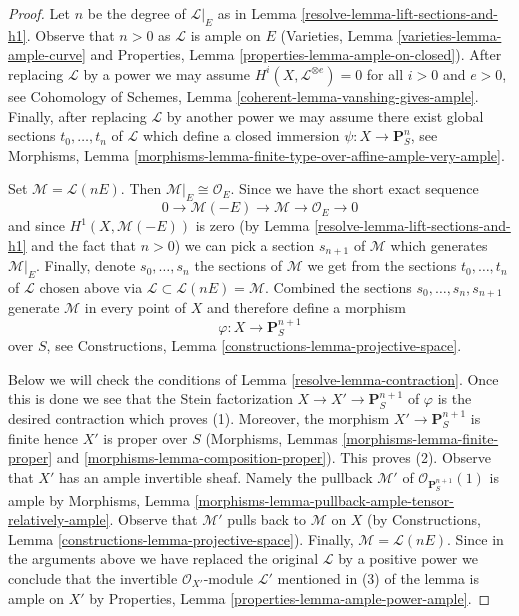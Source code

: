 \begin{proof}

Let $n$ be the degree of $\mathcal{L}|_E$ as in
Lemma \ref{resolve-lemma-lift-sections-and-h1}.
Observe that $n > 0$ as $\mathcal{L}$ is ample on $E$
(Varieties, Lemma \ref{varieties-lemma-ample-curve} and
Properties, Lemma \ref{properties-lemma-ample-on-closed}).
After replacing $\mathcal{L}$ by a power we may assume
$H^i(X, \mathcal{L}^{\otimes e}) = 0$ for all $i > 0$ and $e > 0$, see
Cohomology of Schemes,
Lemma \ref{coherent-lemma-vanshing-gives-ample}.
Finally, after replacing $\mathcal{L}$ by another power we may assume
there exist global sections $t_0, \ldots, t_n$ of $\mathcal{L}$
which define a closed immersion $\psi : X \to \mathbf{P}^n_S$, see
Morphisms, Lemma
\ref{morphisms-lemma-finite-type-over-affine-ample-very-ample}.

\medskip\noindent
Set $\mathcal{M} = \mathcal{L}(nE)$. Then $\mathcal{M}|_E \cong \mathcal{O}_E$.
Since we have the short exact sequence
$$
0 \to \mathcal{M}(-E) \to \mathcal{M} \to \mathcal{O}_E \to 0
$$
and since $H^1(X, \mathcal{M}(-E))$ is zero
(by Lemma \ref{resolve-lemma-lift-sections-and-h1} and the fact that $n > 0$)
we can pick a section $s_{n + 1}$ of $\mathcal{M}$ which generates
$\mathcal{M}|_E$.
Finally, denote $s_0, \ldots, s_n$ the sections of $\mathcal{M}$
we get from the sections $t_0, \ldots, t_n$ of $\mathcal{L}$
chosen above via $\mathcal{L} \subset \mathcal{L}(nE) = \mathcal{M}$.
Combined the sections $s_0, \ldots, s_n, s_{n + 1}$
generate $\mathcal{M}$ in every point of $X$ and therefore define
a morphism
$$
\varphi : X \longrightarrow \mathbf{P}^{n + 1}_S
$$
over $S$, see Constructions, Lemma \ref{constructions-lemma-projective-space}.

\medskip\noindent
Below we will check the conditions of Lemma \ref{resolve-lemma-contraction}.
Once this is done we see that the Stein factorization
$X \to X' \to \mathbf{P}^{n + 1}_S$ of $\varphi$ is the desired contraction
which proves (1).
Moreover, the morphism $X' \to \mathbf{P}^{n + 1}_S$ is finite
hence $X'$ is proper over $S$
(Morphisms, Lemmas \ref{morphisms-lemma-finite-proper} and
\ref{morphisms-lemma-composition-proper}). This proves (2).
Observe that $X'$ has an ample invertible sheaf. Namely the pullback
$\mathcal{M}'$ of $\mathcal{O}_{\mathbf{P}^{n + 1}_S}(1)$ is ample by
Morphisms, Lemma \ref{morphisms-lemma-pullback-ample-tensor-relatively-ample}.
Observe that $\mathcal{M}'$ pulls back to $\mathcal{M}$ on $X$
(by Constructions, Lemma \ref{constructions-lemma-projective-space}).
Finally, $\mathcal{M} = \mathcal{L}(nE)$. Since in the arguments above
we have replaced the original $\mathcal{L}$ by a positive power
we conclude that the invertible $\mathcal{O}_{X'}$-module $\mathcal{L}'$
mentioned in (3) of the lemma is ample on $X'$ by
Properties, Lemma \ref{properties-lemma-ample-power-ample}.


\end{proof}
